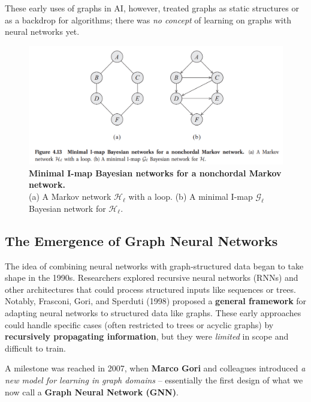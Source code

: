 \documentclass{article}
\begin{document}
These early uses of graphs in AI, however, treated graphs as static structures or as a backdrop for algorithms; there was \textit{no concept} of learning on graphs with neural networks yet.

\begin{figure}[ht]
      \centering
      \includegraphics[width=1\textwidth,trim=0 100 0 0,clip]{../assets/bayesian-and-markov-networks.png}
      \caption{\textbf{Minimal I-map Bayesian networks for a nonchordal Markov network.} \\ (a) A Markov network $\mathcal{H}_\ell$ with a loop. (b) A minimal I-map $\mathcal{G}_\ell$ Bayesian network for $\mathcal{H}_\ell$.}
      \label{fig:bayesian-networks}
\end{figure}

\subsection{The Emergence of Graph Neural Networks}

The idea of combining neural networks with graph-structured data began to take shape in the 1990s.
Researchers explored recursive neural networks (RNNs) \cite{schmidt2019recurrent} and other architectures that could process structured inputs like sequences or trees.
Notably, Frasconi, Gori, and Sperduti (1998) \cite{frasconi1998general} proposed a \textbf{general framework} for adapting neural networks to structured data like graphs.
These early approaches could handle specific cases (often restricted to trees or acyclic graphs) by \textbf{recursively propagating information}, but they were \textit{limited} in scope and difficult to train.

A milestone was reached in 2007, when \textbf{Marco Gori} and colleagues introduced \textit{a new model for learning in graph domains} \cite{gori2007new} – essentially the first design of what we now call a \textbf{Graph Neural Network (GNN)}.
\end{document}
